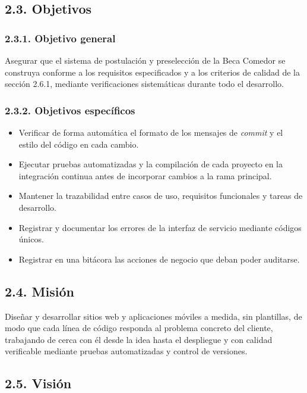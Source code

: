 \subsection{2.3. Objetivos}

\subsubsection{2.3.1. Objetivo general}

Asegurar que el sistema de postulación y preselección de la Beca Comedor se construya conforme a los requisitos especificados y a los criterios de calidad de la sección 2.6.1, mediante verificaciones sistemáticas durante todo el desarrollo.

\subsubsection{2.3.2. Objetivos específicos}

\begin{itemize}
    \item Verificar de forma automática el formato de los mensajes de \textit{commit} y el estilo del código en cada cambio.
    \item Ejecutar pruebas automatizadas y la compilación de cada proyecto en la integración continua antes de incorporar cambios a la rama principal.
    \item Mantener la trazabilidad entre casos de uso, requisitos funcionales y tareas de desarrollo.
    \item Registrar y documentar los errores de la interfaz de servicio mediante códigos únicos.
    \item Registrar en una bitácora las acciones de negocio que deban poder auditarse.
\end{itemize}

\subsection{2.4. Misión}

Diseñar y desarrollar sitios web y aplicaciones móviles a medida, sin plantillas, de modo que cada línea de código responda al problema concreto del cliente, trabajando de cerca con él desde la idea hasta el despliegue y con calidad verificable mediante pruebas automatizadas y control de versiones.

\subsection{2.5. Visión}

